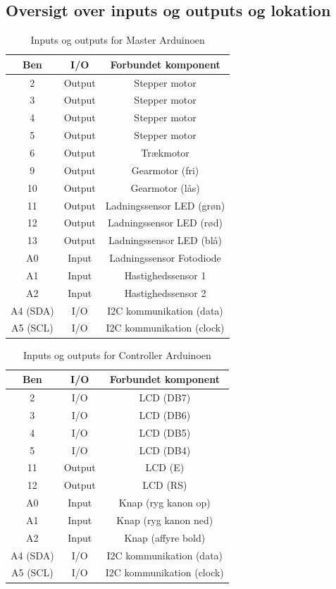 \subsection{Oversigt over inputs og outputs og lokation}
\begin{table}[H]
	\caption{Inputs og outputs for Master Arduinoen} %
	\label{tab:IOMaster}
	\centering
		\begin{tabular}{c|c c} 
		Ben & I/O & Forbundet komponent\\ [0.5ex] 
		\hline 
			2 & Output & Stepper motor\\
			3 & Output & Stepper motor\\
			4 & Output & Stepper motor\\
			5 & Output & Stepper motor\\
			6 & Output & Trækmotor\\
			9 & Output & Gearmotor (fri)\\
			10 & Output & Gearmotor (lås)\\
			11 & Output & Ladningssensor LED (grøn)\\
			12 & Output & Ladningssensor LED (rød)\\
			13 & Output & Ladningssensor LED (blå)\\
			A0 & Input & Ladningssensor Fotodiode\\
			A1 & Input & Hastighedssensor 1\\			
			A2 & Input & Hastighedssensor 2\\
			A4 (SDA) & I/O & I2C kommunikation (data)\\
			A5 (SCL) & I/O & I2C kommunikation (clock)\\[1ex]
		\hline %
	\end{tabular}
\end{table}

\begin{table}[H]
	\caption{Inputs og outputs for Controller Arduinoen} %
	\label{tab:IOController}
	\centering
		\begin{tabular}{c|c c} 
		Ben & I/O & Forbundet komponent\\ [0.5ex] 
		\hline 
			2 & I/O & LCD (DB7)\\
			3 & I/O & LCD (DB6)\\
			4 &I/O & LCD (DB5)\\
			5 &I/O & LCD (DB4)\\
			11 & Output & LCD (E)\\
			12 &Output & LCD (RS)\\
			A0 & Input & Knap (ryg kanon op)\\
			A1 & Input & Knap (ryg kanon ned)\\			
			A2 & Input & Knap (affyre bold)\\
			A4 (SDA) & I/O & I2C kommunikation (data)\\
			A5 (SCL) & I/O & I2C kommunikation (clock)\\[1ex]
		\hline %
	\end{tabular}
\end{table}
